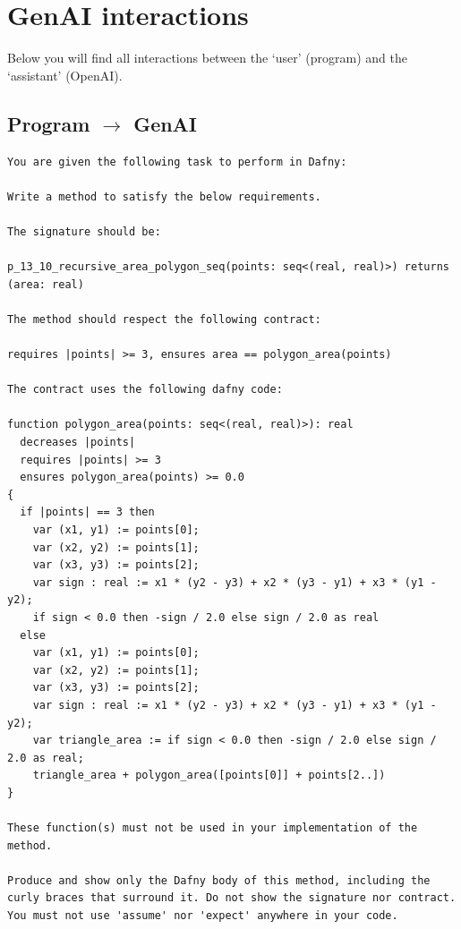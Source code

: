 \documentclass{article}
\begin{document}
\section*{GenAI interactions}
Below you will find all interactions between the `user' (program) and the `assistant' (OpenAI).
\subsection*{Program $\rightarrow$ GenAI}
\begin{lstlisting}
You are given the following task to perform in Dafny:

Write a method to satisfy the below requirements.

The signature should be:

p_13_10_recursive_area_polygon_seq(points: seq<(real, real)>) returns (area: real)

The method should respect the following contract:

requires |points| >= 3, ensures area == polygon_area(points)

The contract uses the following dafny code:

function polygon_area(points: seq<(real, real)>): real
  decreases |points|
  requires |points| >= 3
  ensures polygon_area(points) >= 0.0
{
  if |points| == 3 then 
    var (x1, y1) := points[0];
    var (x2, y2) := points[1];
    var (x3, y3) := points[2];
    var sign : real := x1 * (y2 - y3) + x2 * (y3 - y1) + x3 * (y1 - y2);
    if sign < 0.0 then -sign / 2.0 else sign / 2.0 as real 
  else 
    var (x1, y1) := points[0];
    var (x2, y2) := points[1];
    var (x3, y3) := points[2];
    var sign : real := x1 * (y2 - y3) + x2 * (y3 - y1) + x3 * (y1 - y2);
    var triangle_area := if sign < 0.0 then -sign / 2.0 else sign / 2.0 as real;
    triangle_area + polygon_area([points[0]] + points[2..])
}

These function(s) must not be used in your implementation of the method.

Produce and show only the Dafny body of this method, including the curly braces that surround it. Do not show the signature nor contract. You must not use 'assume' nor 'expect' anywhere in your code.
\end{lstlisting}
\end{document}
